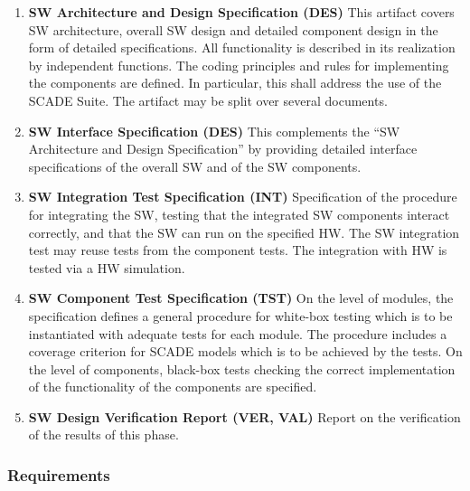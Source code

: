 \documentclass{template/openetcs_article}
\begin{document}
\begin{enumerate}
\item \textbf{SW Architecture and Design Specification (DES)} This
  artifact covers SW architecture, overall SW design and detailed
  component design in the form of detailed specifications. All
  functionality is described in its realization by independent
  functions. The coding principles and rules for implementing the
  components are defined. In particular, this shall address the use of
  the SCADE Suite.  The artifact may be split over several documents.
\item \textbf{SW Interface Specification (DES)} This complements the
  ``SW Architecture and Design Specification'' by providing detailed
  interface specifications of the overall SW and of the SW components. 
\item \textbf{SW Integration Test Specification (INT)} Specification
  of the procedure for integrating the SW, testing that the integrated
  SW components interact correctly, and that the SW can run on the
  specified HW. The SW integration test may reuse tests from the
  component tests. The integration with HW is tested via a HW
  simulation.
\item \textbf{SW Component Test Specification (TST)} On the level of
  modules, the specification defines a general procedure for white-box
  testing which is to be instantiated with adequate tests for each
  module. The procedure includes a coverage criterion for SCADE models
  which is to be achieved by the tests. On the level of components,
  black-box tests checking the correct implementation of the
  functionality of the components are specified.
\item \textbf{SW Design Verification Report (VER, VAL)}
  Report on the verification of the results of this phase.
\end{enumerate}

\subsubsection{Requirements}
\label{sec:4-requirements}
\end{document}
